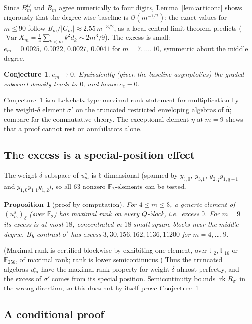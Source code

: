 \documentclass[11pt]{amsart}
\newtheorem{proposition}[theorem]{Proposition}
\newtheorem{conjecture}[theorem]{Conjecture}
\theoremstyle{definition}
\newcommand{\F}{\mathbb{F}}
\newcommand{\rk}{\operatorname{rk}}
\newcommand{\hatn}{\widehat{\mathfrak n}}
\begin{document}
Since $B^Q_m$ and $B_m$ agree numerically to four digits, Lemma~\ref{lem:anticonc} shows rigorously that the
degree-wise baseline is $O(m^{-1/2})$; the exact values for $m\le90$ follow $B_m/|G_m|\approx2.55\,m^{-3/2}$, as a local
central limit theorem predicts ($\operatorname{Var}X_m=\tfrac14\sum_{k<m}k^2d_k\sim2m^3/9$).
The excess is small: $e_m=0.0025,\ 0.0022,\ 0.0027,\ 0.0041$ for $m=7,\dots,10$, symmetric about the middle degree.

\begin{conjecture}\label{conj:excess}
$e_m\to0$. Equivalently (given the baseline asymptotics) the graded cokernel density tends to $0$, and hence $c_e=0$.
\end{conjecture}

Conjecture~\ref{conj:excess} is a Lefschetz-type maximal-rank statement for multiplication by the weight-$\delta$
element $\sigma'$ on the truncated restricted enveloping algebras of $\hatn$; compare \cite{Lefschetz} for the
commutative theory. The exceptional element $\eta$ at $m=9$ shows that a proof cannot rest on annihilators alone.

\subsection{The excess is a special-position effect}
The weight-$\delta$ subspace of $u^s_m$ is $6$-dimensional (spanned by $y_{3,0}$, $y_{3,1}$, $y_{2,q}y_{1,q+1}$ and
$y_{1,0}y_{1,1}y_{1,2}$), so all $63$ nonzero $\F_2$-elements can be tested.
\begin{proposition}[proof by computation]\label{prop:generic}
For $4\le m\le 8$, a generic element of $(u^s_m)_\delta$ (over $\overline{\F}_2$) has maximal rank on every $Q$-block,
i.e.\ excess $0$. For $m=9$ its excess is at most $18$, concentrated in $18$ small square blocks near the middle degree.
By contrast $\sigma'$ has excess $3,30,156,162,1136,11200$ for $m=4,\dots,9$.
\end{proposition}
(Maximal rank is certified blockwise by exhibiting one element, over $\F_2$, $\F_{16}$ or $\F_{256}$, of maximal rank;
rank is lower semicontinuous.) Thus the truncated algebras $u^s_m$ have the maximal-rank property for weight $\delta$
almost perfectly, and the excess of $\sigma'$ comes from its special position. Semicontinuity bounds $\rk R_{\sigma'}$
in the wrong direction, so this does not by itself prove Conjecture~\ref{conj:excess}.

\subsection{A conditional proof}
\end{document}
